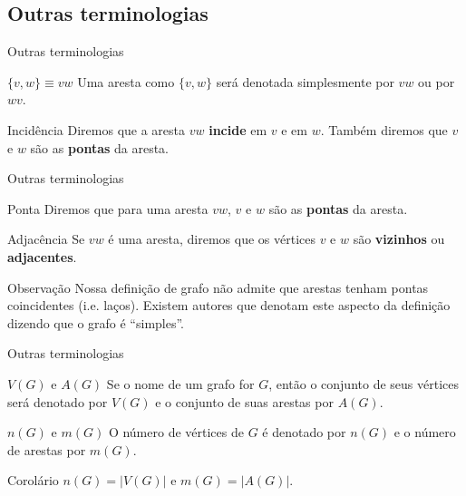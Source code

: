 \documentclass[xcolor=dvipsnames,table]{beamer}
\begin{document}
	\subsection{Outras terminologias}
	\begin{frame}{Outras terminologias}
		\begin{block}{$\{v,w\} \equiv vw$}
			Uma aresta como $\{v,w\}$ será denotada simplesmente por $vw$ ou por $wv$.
		\end{block}
		
		\begin{block}{Incidência}
			Diremos que a aresta $vw$ {\bf incide} em $v$ e em $w$. Também diremos que $v$ e $w$ são as {\bf pontas} da aresta.
		\end{block}
	\end{frame}
	
	\begin{frame}{Outras terminologias}
		\begin{block}{Ponta}
			Diremos que para uma aresta $vw$, $v$ e $w$ são as {\bf pontas} da aresta.
		\end{block}
		
		\begin{block}{Adjacência}
			Se $vw$ é uma aresta, diremos que os vértices $v$ e $w$ são {\bf vizinhos} ou {\bf adjacentes}.
		\end{block}
		
		\begin{block}{Observação}
			Nossa definição de grafo não admite que arestas tenham pontas coincidentes (i.e. laços). Existem autores que denotam este aspecto da definição dizendo que o grafo é ``simples''.
		\end{block}
	\end{frame}
	
	\begin{frame}{Outras terminologias}
		\begin{block}{$V(G)$ e $A(G)$}
			Se o nome de um grafo for $G$, então o conjunto de seus vértices será denotado por $V(G)$ e o conjunto de suas arestas por $A(G)$.
		\end{block}
		
		\begin{block}{$n(G)$ e $m(G)$}
			O número de vértices de $G$ é denotado por $n(G)$ e o número de arestas por $m(G)$. 
		\end{block}
		
		\begin{block}{Corolário}
			$n(G) = |V(G)|$ e $m(G) = |A(G)|$.
		\end{block}
	\end{frame}
	
\end{document}
